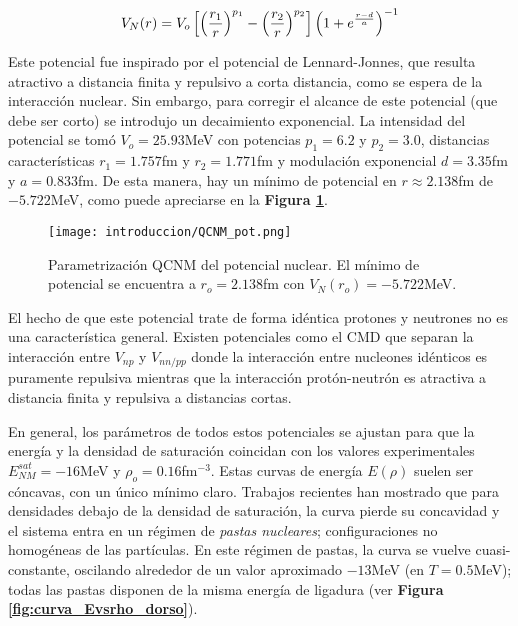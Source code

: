 \begin{equation}{\label{eq:pot_QCNM}}
 V_N(r) = V_o \left[ \left(\frac{r_1}{r}\right)^{p_1} - \left(\frac{r_2}{r}\right)^{p_2} \right] \left( 1 + e^{\frac{r-d}{a}} \right)^{-1}
\end{equation}

Este potencial fue inspirado por el potencial de Lennard-Jonnes, que resulta atractivo a distancia finita y repulsivo a corta distancia, como se espera de la interacción nuclear.
Sin embargo, para corregir el alcance de este potencial (que debe ser corto) se introdujo un decaimiento exponencial.
La intensidad del potencial se tomó $V_o=25.93$MeV con potencias $p_1=6.2$ y $p_2=3.0$, distancias características $r_1=1.757$fm y $r_2=1.771$fm y modulación exponencial $d=3.35$fm y $a=0.833$fm.
De esta manera, hay un mínimo de potencial en $r\approx 2.138$fm de $-5.722$MeV, como puede apreciarse en la \textbf{Figura \ref{fig:graf_QCNM}}.

\begin{figure}[H]
	\centering
	\texttt{[image: introduccion/QCNM\_pot.png]}
	\caption{Parametrización QCNM del potencial nuclear. 
	El mínimo de potencial se encuentra a $r_o=2.138$fm con $V_N(r_o)=-5.722$MeV.}
	\label{fig:graf_QCNM}
\end{figure}

El hecho de que este potencial trate de forma idéntica protones y neutrones no es una característica general.
Existen potenciales como el CMD que separan la interacción entre $V_{np}$ y $V_{nn/pp}$ donde la interacción entre nucleones idénticos es puramente repulsiva mientras que la interacción protón-neutrón 
es atractiva a distancia finita y repulsiva a distancias cortas.

En general, los parámetros de todos estos potenciales se ajustan para que la energía y la densidad de saturación coincidan con los valores experimentales $E_{NM}^{sat}=-16$MeV y $\rho_o=0.16$fm$^{-3}$\cite{Dorso1988}.
Estas curvas de energía $E(\rho)$ suelen ser cóncavas, con un único mínimo claro.
Trabajos recientes \cite{Schrader2009,GimenezMolinelli2014, GimenezMolinelli2015} han mostrado que para densidades debajo de la densidad de saturación, la curva pierde su concavidad y el sistema entra en un 
régimen de \textit{pastas nucleares}; configuraciones no homogéneas de las partículas.
En este régimen de pastas, la curva se vuelve cuasi-constante, oscilando alrededor de un valor aproximado $-13$MeV (en $T=0.5$MeV)\cite{Dorso2018}; todas las pastas disponen de la misma energía de ligadura (ver \textbf{Figura \ref{fig:curva_Evsrho_dorso}}).

